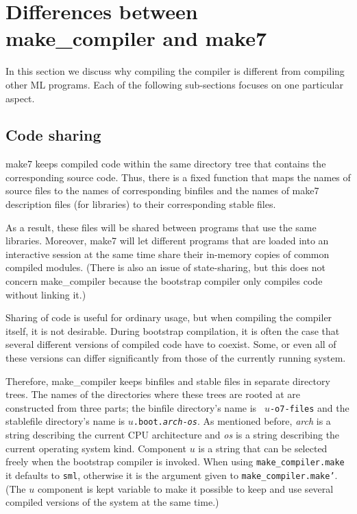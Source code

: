 
\section{Differences between make_compiler and make7}

In this section we discuss why compiling the compiler is different
from compiling other ML programs.  Each of the following sub-sections
focuses on one particular aspect.

\subsection{Code sharing}

make7 keeps compiled code within the same directory tree that contains
the corresponding source code.  Thus, there is a fixed function
that maps the names of source files to the names of corresponding
binfiles and the names of make7 description files (for libraries) to
their corresponding stable files.

As a result, these files will be shared between programs that use the
same libraries.  Moreover, make7 will let different programs that are
loaded into an interactive session at the same time share their
in-memory copies of common compiled modules.  (There is also an issue of
state-sharing, but this does not concern make_compiler because the bootstrap
compiler only compiles code without linking it.)

Sharing of code is useful for ordinary usage, but when compiling the
compiler itself, it is not desirable.  During bootstrap compilation,
it is often the case that several different versions of compiled code
have to coexist.  Some, or even all of these versions can differ
significantly from those of the currently running system.

Therefore, make_compiler keeps binfiles and stable files in separate directory
trees.  The names of the directories where these trees are rooted at
are constructed from three parts; the binfile directory's name is {\tt
$u$-o7-files} and the stablefile directory's name is
{\tt $u$.boot.{\it arch}-{\it os}}.  As mentioned before, {\it arch}
is a string describing the current CPU architecture and {\it os} is a
string describing the current operating system kind. Component $u$ is
a string that can be selected freely when the bootstrap compiler is
invoked.  When using {\tt make_compiler.make} it defaults to {\tt sml},
otherwise it is the argument given to {\tt make_compiler.make'}.  (The $u$
component is kept variable to make it possible to keep and use several
compiled versions of the system at the same time.)

